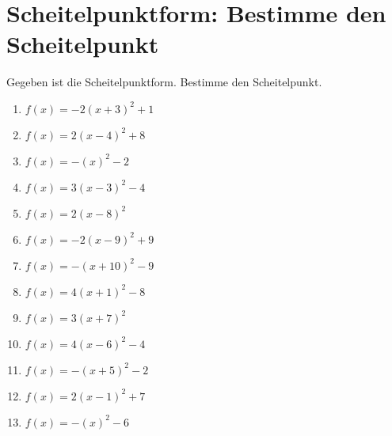 \documentclass{article}%
\begin{document}
\section{Scheitelpunktform: Bestimme den Scheitelpunkt}%
\label{sec:ScheitelpunktformBestimmedenScheitelpunkt}%
Gegeben ist die Scheitelpunktform. Bestimme den Scheitelpunkt.%
\begin{enumerate}[label=\alph*)]%
\item%
\newline\vspace{0.5cm} $f(x)=-2(x+3)^2 +1$%
\item%
\newline\vspace{0.5cm} $f(x)=2(x-4)^2 +8$%
\item%
\newline\vspace{0.5cm} $f(x)=-(x)^2 -2$%
\item%
\newline\vspace{0.5cm} $f(x)=3(x-3)^2 -4$%
\item%
\newline\vspace{0.5cm} $f(x)=2(x-8)^2$%
\item%
\newline\vspace{0.5cm} $f(x)=-2(x-9)^2 +9$%
\item%
\newline\vspace{0.5cm} $f(x)=-(x+10)^2 -9$%
\item%
\newline\vspace{0.5cm} $f(x)=4(x+1)^2 -8$%
\item%
\newline\vspace{0.5cm} $f(x)=3(x+7)^2$%
\item%
\newline\vspace{0.5cm} $f(x)=4(x-6)^2 -4$%
\item%
\newline\vspace{0.5cm} $f(x)=-(x+5)^2 -2$%
\item%
\newline\vspace{0.5cm} $f(x)=2(x-1)^2 +7$%
\item%
\newline\vspace{0.5cm} $f(x)=-(x)^2 -6$%

\end{enumerate}
\end{document}
